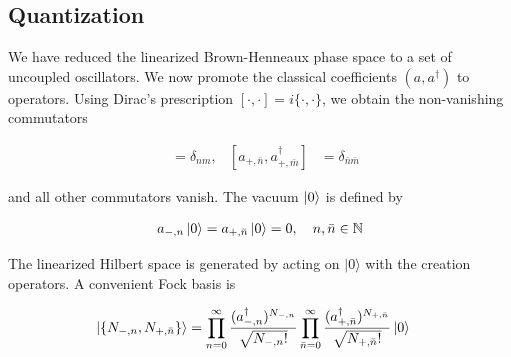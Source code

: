 \subsection{Quantization}\label{quantization-1}

We have reduced the linearized Brown-Henneaux phase space to a set of uncoupled oscillators. We now promote the classical coefficients \((a,a^{\dagger})\) to operators. Using Dirac's prescription \([\cdot,\cdot]=i\{\cdot,\cdot\}\), we obtain the non-vanishing commutators

\begin{align}
[a_{-,n},a^{\dagger}_{-,m}] & =\delta _{nm}, & [a_{+,\bar{n}},a^{\dagger}_{+,\bar{m}}] & =\delta _{\bar{n}\bar{m}}
\end{align}

and all other commutators vanish. The vacuum \(\left|0\right\rangle\) is defined by

\begin{align}
a_{-,n}\left|0\right\rangle =a_{+,\bar{n}}\left|0\right\rangle =0, \quad n,\bar{n}\in \mathbb{N}
\end{align}

The linearized Hilbert space is generated by acting on \(|0\rangle\) with the creation operators. A convenient Fock basis is

\begin{align}
\left|\left\{N_{-,n},N_{+,\bar{n}}\right\}\right\rangle & =\prod ^{\infty}_{n=0} \frac{(a^{\dagger}_{-,n})^{N_{-,n}}}{\sqrt{ N_{-,n}! }} \prod ^{\infty}_{\bar{n}=0} \frac{(a^{\dagger}_{+,\bar{n}})^{N_{+,\bar{n}}}}{\sqrt{ N_{+,\bar{n}}! }} \left|0\right\rangle
\end{align}

